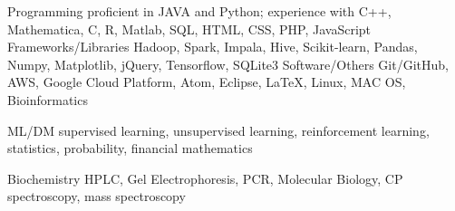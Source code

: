 

\begin{cvskills}

  \cvskill
    {Programming} %
    {proficient in JAVA and Python; experience with C++, Mathematica, C, R, Matlab, SQL, HTML, CSS, PHP, JavaScript}
  \cvskill
	{Frameworks/Libraries} 
    {Hadoop, Spark, Impala, Hive, Scikit-learn, Pandas, Numpy, Matplotlib, jQuery, Tensorflow, SQLite3}
  \cvskill
	{Software/Others} 
    {Git/GitHub, AWS, Google Cloud Platform, Atom, Eclipse, LaTeX, Linux, MAC OS, Bioinformatics} %

  \cvskill
    {ML/DM} %
    {supervised learning, unsupervised learning, reinforcement learning, statistics, probability, financial mathematics} %

  \cvskill
    {Biochemistry} %
    {HPLC, Gel Electrophoresis, PCR, Molecular Biology, CP spectroscopy, mass spectroscopy} %

\end{cvskills}
